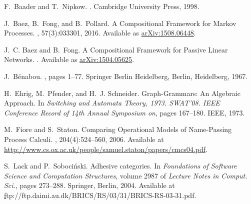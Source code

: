 \documentclass[11pt]{amsart}
\theoremstyle{remark}
\theoremstyle{definition}
\begin{document}
%
%

%
\begin{thebibliography}{10}
	
	F.~Baader and T.~Nipkow.
	.
	\newblock Cambridge University Press, 1998.
	
	J.~Baez, B.~Fong, and B.~Pollard.
	\newblock A {C}ompositional {F}ramework for {M}arkov {P}rocesses.
	, 57(3):033301, 2016.
	\newblock Available as
	\href{https://arxiv.org/abs/1508.06448}{arXiv:1508.06448}.
	
	J.~C. Baez and B.~Fong.
	\newblock A {C}ompositional {F}ramework for {P}assive {L}inear {N}etworks.
	.
	\newblock Available as
	\href{https://arxiv.org/abs/1504.05625}{arXiv:1504.05625}.
	
	J.~B{\'e}nabou.
	, pages 1--77.
	\newblock Springer Berlin Heidelberg, Berlin, Heidelberg, 1967.
	
	H.~Ehrig, M.~Pfender, and H.~J. Schneider.
	\newblock Graph-{G}rammars: An {A}lgebraic {A}pproach.
	\newblock In {\em Switching and Automata Theory, 1973. SWAT'08. IEEE Conference
		Record of 14th Annual Symposium on}, pages 167--180. IEEE, 1973.
	
	M.~Fiore and S.~Staton.
	\newblock Comparing {O}perational {M}odels of {N}ame-{P}assing {P}rocess
	{C}alculi.
	, 204(4):524--560, 2006.
	\newblock Available at
	\href{http://www.cs.ox.ac.uk/people/samuel.staton/papers/cmcs04.pdf}{http://www.cs.ox.ac.uk/people/samuel.staton/papers/cmcs04.pdf}.
	
	S.~Lack and P.~Soboci{\'n}ski.
	\newblock Adhesive categories.
	\newblock In {\em Foundations of {S}oftware {S}cience and {C}omputation
		{S}tructures}, volume 2987 of {\em Lecture Notes in Comput. Sci.}, pages
	273--288. Springer, Berlin, 2004.
	\newblock Available at
	{\href{ftp://ftp.daimi.au.dk/BRICS/RS/03/31/BRICS-RS-03-31.pdf}ftp://ftp.daimi.au.dk/BRICS/RS/03/31/BRICS-RS-03-31.pdf}.
	

\end{thebibliography}
\end{document}
